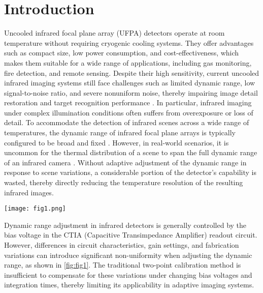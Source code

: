 \documentclass[a4paper,fleqn]{cas-dc}
\begin{document}
\section{Introduction}
Uncooled infrared focal plane array (UFPA) detectors operate at room temperature without requiring cryogenic cooling systems. They offer advantages such as compact size, low power consumption, and cost-effectiveness, which makes them suitable for a wide range of applications, including gas monitoring, fire detection, and remote sensing\citep{yadav_advancements_2022,zhang_real-time_2025}. Despite their high sensitivity, current uncooled infrared imaging systems still face challenges such as limited dynamic range, low signal-to-noise ratio, and severe nonuniform noise, thereby impairing image detail restoration and target recognition performance \citep{zhou_scene-based_2017,zuo_registration_2012,wang_raw_2024}.
In particular, infrared imaging under complex illumination conditions often suffers from overexposure or loss of detail. To accommodate the detection of infrared scenes across a wide range of temperatures, the dynamic range of infrared focal plane arrays is typically configured to be broad and fixed \citep{belenky_method_2004,tanaka_performance_2003}. However, in real-world scenarios, it is uncommon for the thermal distribution of a scene to span the full dynamic range of an infrared camera \citep{teledyne_flir_free_nodate,asl_thermal_2014,wu_thermal_2014}. Without adaptive adjustment of the dynamic range in response to scene variations, a considerable portion of the detector’s capability is wasted, thereby directly reducing the temperature resolution of the resulting infrared images.

\begin{figure*}[ht]
    \centering
    \texttt{[image: fig1.png]}
    \caption{Adjusting the CTIA circuit and suppresses the associated circuit-induced noise fully utilizes the dynamic range of the UFPA.}
    \label{fig:fig1}
\end{figure*}

Dynamic range adjustment in infrared detectors is generally controlled by the bias voltage in the CTIA (Capacitive Transimpedance Amplifier) readout circuit\citep{seo_analog_2013}. However, differences in circuit characteristics, gain settings, and fabrication variations can introduce significant non-uniformity when adjusting the dynamic range, as shown in \cref{fig:fig1}. The traditional two-point calibration method is insufficient to compensate for these variations under changing bias voltages and integration times, thereby limiting its applicability in adaptive imaging systems.
\end{document}
